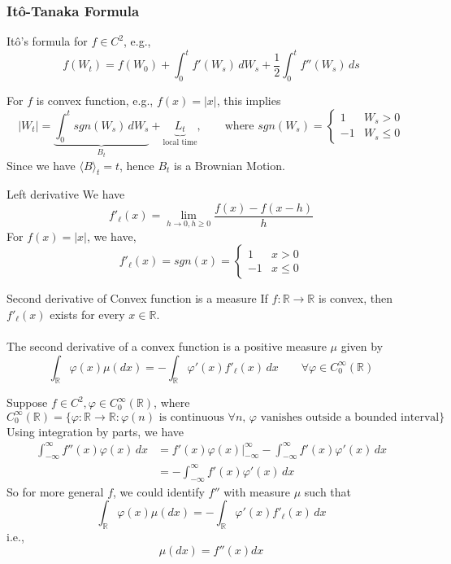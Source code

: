 \documentclass[12pt,a4paper]{article}
\newcommand{\R}{\mathbb{R}}
\begin{document}
\pagebreak
\subsubsection{It\^{o}-Tanaka Formula}
It\^{o}'s formula for $f\in C^2$, e.g.,
$$
f(W_t) = f(W_0) + \int_0^t f'(W_s)\, dW_s + \frac{1}{2} \int_0^t f''(W_s)\, ds
$$

For $f$ is convex function, e.g., $f(x) = |x|$, this implies
$$
|W_t| = \underbrace{\int_0^t sgn(W_s)\, dW_s}_{B_t}+ \underbrace{L_t}_{\text{local time}},\qquad\text{where } sgn(W_s) = \begin{cases}
    1 & W_s>0\\
    -1 & W_s\le 0
\end{cases} 
$$
Since we have $\langle B\rangle_t = t$, hence $B_t$ is a Brownian Motion.
\begin{remark}{Left derivative}{}
    We have
    $$
    f'_{\ell}(x) = \lim_{h\to 0,h\ge 0} \frac{f(x)-f(x-h)}{h}
    $$
    For $f(x) = |x|$, we have,
    $$
    f'_{\ell}(x) = sgn(x)=  \begin{cases}
      1 & x>0 \\
      -1 & x\le 0
    \end{cases}
    $$
\end{remark}
\begin{theorem}{Second derivative of Convex function is a measure}{}
    If $f:\R\to \R$ is convex, then $f'_{\ell}(x)$ exists for every $x\in \R$.\\
    \\
    The second derivative of a convex function is a positive measure $\mu$ given by
    $$
    \int_\R \varphi(x) \mu(dx) = -\int_\R \varphi'(x) f'_{\ell}(x)\, dx\qquad\forall \varphi\in C^{\infty}_0(\R)
    $$
\end{theorem}
Suppose $f\in C^2, \varphi\in C_0^\infty(\R)$, where
$$
C_0^\infty(\R) = \{\varphi: \R\to\R: \varphi{(n)} \text{ is continuous $\forall n$, $\varphi$ vanishes outside a bounded interval}\}
$$
Using integration by parts, we have
\begin{align*}
    \int_{-\infty}^\infty f''(x)\varphi(x)\, dx &= f'(x)\varphi(x)\bigg|_{-\infty}^\infty - \int_{-\infty}^{\infty} f'(x)\varphi'(x)\, dx\\
    &= -\int_{-\infty}^{\infty} f'(x)\varphi'(x)\, dx
\end{align*}
So for more general $f$, we could identify $f''$ with measure $\mu$ such that
$$
\int_\R \varphi(x) \mu(dx) = -\int_\R \varphi'(x)f'_{\ell}(x)\, dx
$$
i.e., 
$$
\mu(dx) = f''(x)dx
$$
\pagebreak
\end{document}
